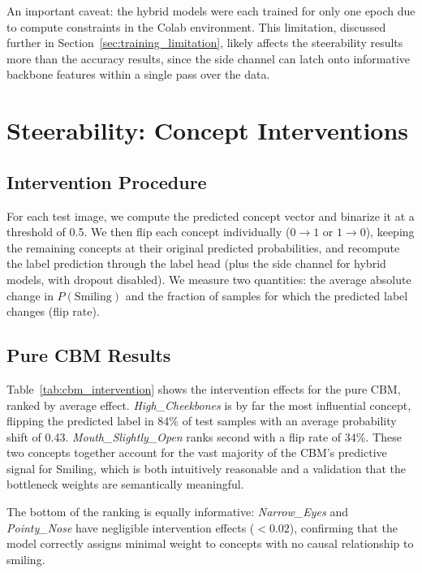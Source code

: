 \documentclass[11pt,a4paper]{article}
\begin{document}
An important caveat: the hybrid models were each trained for only one epoch due to compute constraints in the Colab environment. This limitation, discussed further in Section~\ref{sec:training_limitation}, likely affects the steerability results more than the accuracy results, since the side channel can latch onto informative backbone features within a single pass over the data.


\section{Steerability: Concept Interventions}

\subsection{Intervention Procedure}

For each test image, we compute the predicted concept vector and binarize it at a threshold of 0.5. We then flip each concept individually ($0 \to 1$ or $1 \to 0$), keeping the remaining concepts at their original predicted probabilities, and recompute the label prediction through the label head (plus the side channel for hybrid models, with dropout disabled). We measure two quantities: the average absolute change in $P(\text{Smiling})$ and the fraction of samples for which the predicted label changes (flip rate).

\subsection{Pure CBM Results}

Table~\ref{tab:cbm_intervention} shows the intervention effects for the pure CBM, ranked by average effect. \emph{High\_Cheekbones} is by far the most influential concept, flipping the predicted label in 84\% of test samples with an average probability shift of 0.43. \emph{Mouth\_Slightly\_Open} ranks second with a flip rate of 34\%. These two concepts together account for the vast majority of the CBM's predictive signal for Smiling, which is both intuitively reasonable and a validation that the bottleneck weights are semantically meaningful.

The bottom of the ranking is equally informative: \emph{Narrow\_Eyes} and \emph{Pointy\_Nose} have negligible intervention effects ($< 0.02$), confirming that the model correctly assigns minimal weight to concepts with no causal relationship to smiling.
\end{document}
